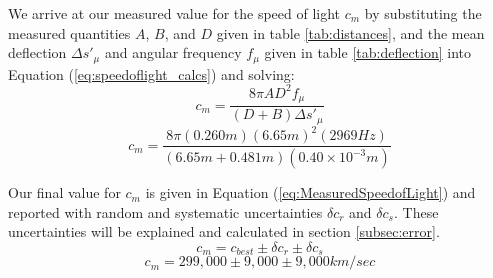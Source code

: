 \documentclass[twocolumn]{article}
\begin{document}
	\fi

	We arrive at our measured value for the speed of light $c_m$ by substituting the measured quantities $A$, $B$, and $D$ given in table \ref{tab:distances}, and the mean deflection $\Delta s'_\mu$ and angular frequency $f_\mu$ given in table \ref{tab:deflection} into Equation (\ref{eq:speedoflight_calcs}) and solving:
	\begin{equation}
		c_{m} = \frac{8\pi AD^2 f_\mu}{(D+B)\Delta s'_\mu}
	\end{equation}
	\begin{equation}
		c_{m} = \frac{8\pi (0.260m)(6.65m)^2(2969Hz)}{(6.65m + 0.481m)(0.40\times 10^{-3}m)}
	\end{equation}
	
	Our final value for $c_m$ is given in Equation (\ref{eq:MeasuredSpeedofLight}) and reported with random and systematic uncertainties $\delta c_{r}$ and $\delta c_{s}$.
	These uncertainties will be explained and calculated in section \ref{subsec:error}.
	\begin{equation*}
	c_m = c_{best}\pm \delta c_{r} \pm \delta c_{s}
	\end{equation*}
	\begin{equation}
		\label{eq:MeasuredSpeedofLight}
		c_{m} = 299,000\pm 9,000\pm 9,000 km/sec
	\end{equation}
	
\end{document}
